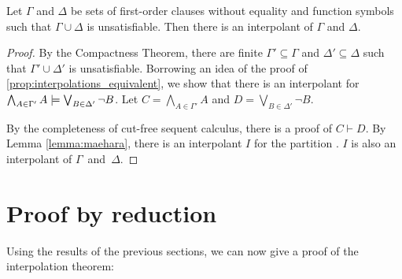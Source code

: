 \begin{thm}
	\label{thm:prop_interpol}
	Let $\Gamma$ and $\Delta$ be sets of first-order clauses without equality and function symbols such that $\Gamma \cup \Delta$ is unsatisfiable. Then there is an interpolant of $\Gamma$ and $\Delta$.
\end{thm}
\begin{proof}
	By the Compactness Theorem, there are finite $\Gamma' \subseteq \Gamma$ and $\Delta' \subseteq \Delta$ such that $\Gamma' \cup \Delta'$ is unsatisfiable.
	Borrowing an idea of the proof of \ref{prop:interpolations_equivalent},
	we show that there is an interpolant for $\bigwedge_{A\in \Gamma'}A \models \bigvee_{B \in \Delta'} \lnot B$.
	Let $C = \bigwedge_{A \in \Gamma'} A$ and $D = \bigvee_{B \in \Delta'} \lnot B$.

	By the completeness of cut-free sequent calculus, there is a proof of $C \vdash D$.
	By Lemma \ref{lemma:maehara}, there is an interpolant $I$ for the partition . $I$ is also an interpolant of $\Gamma$~and~$\Delta$.

\end{proof}





		\section{Proof by reduction}

		Using the results of the previous sections, we can now give a proof of the interpolation theorem:

